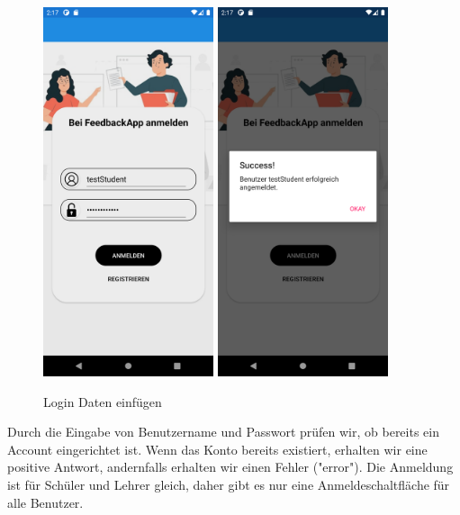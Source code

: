 \begin{figure}[h]
    \begin{center}
    \includegraphics[width=5cm]{pics/Xamarin Student/5 Login Page Full.png}\hfill
    \includegraphics[width=5cm]{pics/Xamarin Student/6 Login Page Success.png}
    \caption[LoginPage]{Login Daten einfügen}
    \end{center}
\end{figure}
Durch die Eingabe von Benutzername und Passwort prüfen wir, ob bereits ein Account eingerichtet ist. Wenn das Konto bereits existiert, erhalten wir eine positive Antwort, andernfalls erhalten wir einen Fehler ("error"). Die Anmeldung ist für Schüler und Lehrer gleich, daher gibt es nur eine Anmeldeschaltfläche für alle Benutzer.\newpage
\newpage

